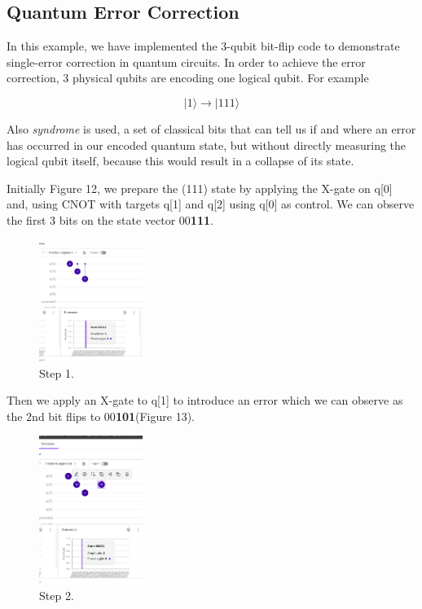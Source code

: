\documentclass[12pt]{ieeetj}
\begin{document}
		

		\subsection{Quantum Error Correction}
		
		In this example, we have implemented the 3-qubit bit-flip code to demonstrate single-error correction in
		quantum circuits.
		In order to achieve the error correction, 3 physical qubits are encoding one logical qubit.
		For example 
		
			\[
				|1\rangle \rightarrow |111\rangle 
			\]

		Also \textit{syndrome} is used, a set of classical bits that can tell us if and where an error has
		occurred in our encoded quantum state, but without directly measuring the logical qubit itself, because
		this would result in a collapse of its state.

		Initially Figure 12, 
		we prepare the (111) state by applying the X-gate on q[0] and, 
		using CNOT with targets q[1] and q[2]
		using q[0] as control. We can observe the first 3 bits on the state vector 00\textbf{111}.
		\begin{figure}[H]
			\centering
			\includegraphics[width=0.3\textwidth]{ibmq/step_a.png}
			\caption{Step 1.}
			\label{fig12:}
		\end{figure}		

		Then we apply an X-gate to q[1] to introduce an error which we can observe as the 2nd bit flips
		to 00\textbf{101}(Figure 13).
		\begin{figure}[H]
			\centering
			\includegraphics[width=0.3\textwidth]{ibmq/step_b.png}
			\caption{Step 2.}
			\label{fig13:}
		\end{figure}		
\end{document}
